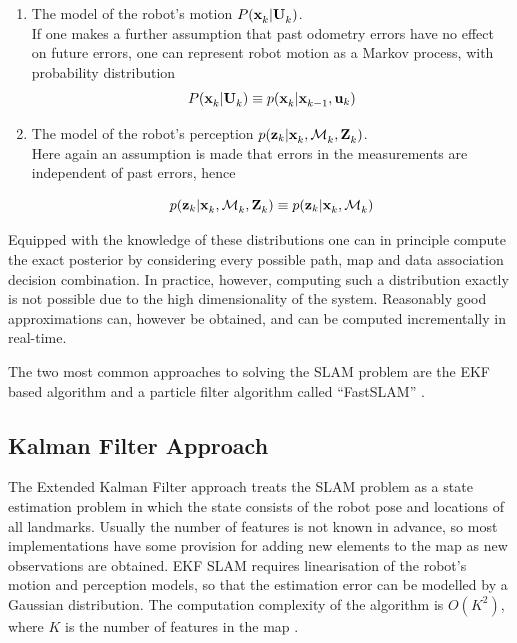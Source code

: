 \begin{enumerate}

\item The model of the robot's motion $P(\x{k}{}{} | \Uall{k}{})$. \\
If one makes a further assumption that past odometry errors have no
effect on future errors, one can represent robot motion as a Markov
process, with probability distribution 
\begin{equation}
 P(\x{k}{}{} | \Uall{k}{}) \equiv p(\x{k}{}{}| \x{k-1}{}{}, \U{k})
\end{equation}


\item The model of the robot's perception
$p(\z{k}| \x{k}{}{},\map{k}{}{}, \Zall{k}{})$.\\
Here again an assumption is made that errors in the measurements are
independent of past errors, hence

\begin{equation}
p(\z{k}| \x{k}{}{},\map{k}{}{}, \Zall{k}{}) \equiv 
  p(\z{k}| \x{k}{}{},\map{k}{}{})
\end{equation}

\end{enumerate}

Equipped with the knowledge of these distributions one can in
principle compute the exact posterior by considering every possible
path, map and data association decision combination. In practice,
however, computing such a distribution exactly is not possible due to
the high dimensionality of the system. Reasonably good approximations
can, however be obtained, and can be computed incrementally in
real-time.

The two most common approaches to solving the SLAM problem are the EKF
based algorithm \cite{ekf_slam} and a particle filter algorithm called
``FastSLAM'' \cite{fastslam}.

\subsection{Kalman Filter Approach}
The Extended Kalman Filter approach treats the SLAM problem as a state
estimation problem in which the state consists of the robot pose and
locations of all landmarks. Usually the number of features is not
known in advance, so most implementations have some provision for
adding new elements to the map as new observations are obtained. EKF
SLAM requires linearisation of the robot's motion and perception
models, so that the estimation error can be modelled by a Gaussian
distribution.  The computation complexity of the algorithm is
$O(K^2)$, where $K$ is the number of features in the map
\cite{ekf_slam}.

